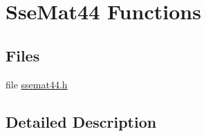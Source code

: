 \hypertarget{group___s_s_e___m_a_t___m_a_t_h___f_u_n_c_s}{}\section{Sse\+Mat44 Functions}
\label{group___s_s_e___m_a_t___m_a_t_h___f_u_n_c_s}
\subsection*{Files}
\begin{DoxyCompactItemize}
\item 
file \hyperlink{ssemat44_8h}{ssemat44.\+h}
\end{DoxyCompactItemize}


\subsection{Detailed Description}
